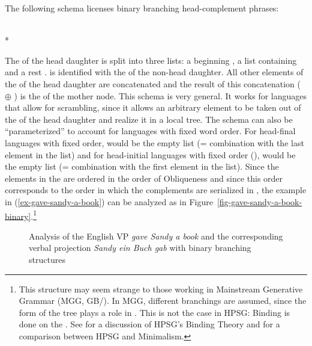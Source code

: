 \documentclass[output=paper
	        ,collection
	        ,collectionchapter
 	        ,biblatex
                ,babelshorthands
                ,newtxmath
                ,draftmode
                ,colorlinks, citecolor=brown
]{langscibook}
\begin{document}
The following schema licenses binary branching head-complement phrases:
\begin{schema}
\label{hcs-binary}
 \impl\\*
\end{schema}
The \compsl of the head daughter is split into three lists: a beginning , a list containing  and a rest
.  is identified with the \synsemv of the non-head daughter. All other elements of
the \compsl of the head daughter are concatenated and the result of this concatenation (
$\oplus$ ) is the \compsl of the mother node. This schema is very general. It works for
languages that allow for scrambling, since it allows an arbitrary element to be taken out of the \compsl
of the head daughter and realize it in a local tree. The schema can also be ``parameterized'' to account
for languages with fixed word order. For head-final languages with fixed order,  would be the
empty list (= combination with the last element in the list) and for head-initial languages with
fixed order (\eg {}),  would be the empty list (= combination with the first element in
the list). Since the elements in the \compsl are ordered in the order of Obliqueness \citep{KC77a,Pullum77a} and since this
order corresponds to the order in which the complements are serialized in , the example in (\ref{ex-gave-sandy-a-book}) can be
analyzed as in Figure~\ref{fig-gave-sandy-a-book-binary}.\footnote{
  This structure may seem strange to those working in Mainstream Generative Grammar (MGG,
  GB/). In MGG, different branchings are assumed, since the form of the tree plays a role in
  . This is not the case in HPSG: Binding is done on the \argstl. See
   for a discussion of HPSG's Binding Theory and
   for a comparison between HPSG and Minimalism.%
}
\begin{figure}
\hfill
{}
\caption{\label{fig-gave-sandy-a-book-binary}\label{fig-sandy-ein-buch-gab}Analysis of the English VP \emph{gave Sandy a book} and
  the corresponding  verbal projection \emph{Sandy ein Buch gab} with binary branching structures}
\end{figure}
\end{document}
